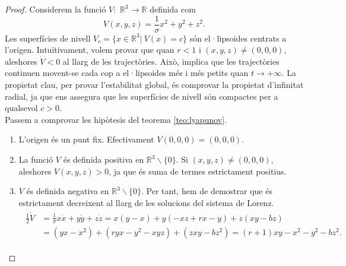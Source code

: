 \documentclass[11pt,a4paper,openright,oneside]{article}
\numberwithin{equation}{section}
\theoremstyle{definition}
\begin{document}
\begin{proof}
    Considerem la funció $V$:\ $\mathbb{R}^{3}\rightarrow{\mathbb{R}}$ definida com 
    \begin{equation*}
        V(x,y,z)=\frac{1}{\sigma}x^{2}+ y^{2}+ z^{2}.
    \end{equation*}
    Les superfícies de nivell $V_c=\{x\in\mathbb{R}^{3}| \ V(x)=c\}$ són el·lipsoides centrats a l'origen. Intuïtivament, volem provar que quan $r<1$ i $(x,y,z)\neq(0,0,0)$, aleshores $\dot{V}<0$ al llarg de les trajectòries. Això, implica que les trajectòries continuen movent-se cada cop a el·lipsoides més i més petits quan $t\rightarrow{+\infty}$. La propietat clau, per provar l'estabilitat global, és comprovar la propietat d'infinitat radial, ja que ens assegura que les superfícies de nivell són compactes per a qualsevol $c>0$. \\Passem a comprovar les hipòtesis del teorema \ref{teo:lyapunov}. \begin{enumerate}
        \item L'origen és un punt fix. Efectivament $V\left(0,0,0\right)=(0,0,0)$.
        \item La funció $V$ és definida positiva en $\mathbb{R}^{3}\backslash{\{0\}}$. Si $(x,y,z)\neq(0,0,0)$, aleshores $V(x,y,z)>0$, ja que és suma de termes estrictament positius.
        \item $\dot{V}$ és definida negativa en $\mathbb{R}^{3}\backslash{\{0\}}$. Per tant, hem de demostrar que és estrictament decreixent al llarg de les solucions del sistema de Lorenz. 
        \begin{equation*}\begin{split}\begin{aligned}
            \frac{1}{2}\dot{V}&=\frac{1}{\sigma}x\dot{x}+y\dot{y}+z\dot{z}=x(y-x)+y(-xz+rx-y)+z(xy-bz)\\ 
            &= (yx-x^{2})+(ryx-y^{2}-xyz)+(zxy-bz^{2})=(r+1)xy-x^{2}-y^{2}-bz^{2}.
        \end{aligned}\end{split}\end{equation*}
        

\end{enumerate}
\end{proof}
\end{document}
